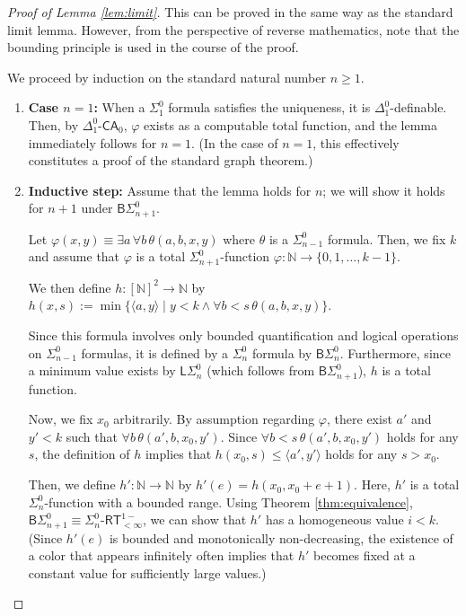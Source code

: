 \documentclass[10pt,reqno]{amsart}
\numberwithin{equation}{section}
\begin{document}
\begin{proof}[Proof of Lemma \ref{lem:limit}]


This can be proved in the same way as the standard limit lemma. However, from the perspective of reverse mathematics, note that the bounding principle is used in the course of the proof.


We proceed by induction on the standard natural number $n \ge 1$.
\begin{enumerate}[label=(\roman*),topsep=0.5em,itemsep=0.5em]
  \item \textbf{Case $n=1$:} When a $\Sigma_{1}^{0}$ formula satisfies the uniqueness, it is $\Delta_{1}^{0}$-definable. Then, by $\Delta_{1}^{0}\text{-}\mathsf{CA}_0$, $\varphi$ exists as a computable total function, and the lemma immediately follows for $n=1$. (In the case of $n=1$, this effectively constitutes a proof of the standard graph theorem.)


  \item \textbf{Inductive step:} Assume that the lemma holds for $n$; we will show it holds for $n+1$ under $\mathsf{B}\Sigma_{n+1}^0$.


  Let $\varphi(x,y)\equiv\exists a \, \forall b \, \theta(a,b,x,y)$ where $\theta$ is a $\Sigma_{n-1}^{0}$ formula.
  Then, we fix $k$ and assume that $\varphi$ is a total $\Sigma_{n+1}^{0}$-function $\varphi\colon\mathbb{N}\to\{0,1,\dots,k-1\}$.


  We then define $h\colon[\mathbb{N}]^2\to\mathbb{N}$ by $h(x,s):=\min\{\langle a,y \rangle \mid y<k \land \forall b < s \, \theta(a,b,x,y) \}$.


  Since this formula involves only bounded quantification and logical operations on $\Sigma_{n-1}^{0}$ formulas, it is defined by a $\Sigma_{n}^{0}$ formula by $\mathsf{B}\Sigma_{n}^{0}$. Furthermore, since a minimum value exists by $\mathsf{L}\Sigma_{n}^{0}$ (which follows from $\mathsf{B}\Sigma_{n+1}^{0}$), $h$ is a total function.


  Now, we fix $x_0$ arbitrarily. By assumption regarding $\varphi$, there exist $a'$ and $y'<k$ such that $\forall b \, \theta(a',b,x_0,y')$. Since $\forall b < s \, \theta(a',b,x_0,y')$ holds for any $s$, the definition of $h$ implies that $h(x_0,s)\le\langle a',y' \rangle$ holds for any $s>x_0$.


  Then, we define $h'\colon\mathbb{N}\to\mathbb{N}$ by $h'(e)=h(x_0,x_0+e+1)$. Here, $h'$ is a total $\Sigma_{n}^{0}$-function with a bounded range. Using Theorem \ref{thm:equivalence}, $\mathsf{B}\Sigma_{n+1}^{0} \equiv \Sigma_{n}^{0}\text{-}\mathsf{RT}_{<\infty}^{1-}$, we can show that $h'$ has a homogeneous value $i<k$. (Since $h'(e)$ is bounded and monotonically non-decreasing, the existence of a color that appears infinitely often implies that $h'$ becomes fixed at a constant value for sufficiently large values.)



\end{enumerate}
\end{proof}
\end{document}
